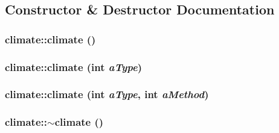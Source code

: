 \subsection{Constructor \& Destructor Documentation}
\hypertarget{classclimate_a36f8f651987de205d69337c77b0b5b4c}{
\subsubsection[{climate}]{\setlength{\rightskip}{0pt plus 5cm}climate::climate ()}}
\label{classclimate_a36f8f651987de205d69337c77b0b5b4c}
\hypertarget{classclimate_a1aa74cca9a2e637a100ed24830f312b1}{
\subsubsection[{climate}]{\setlength{\rightskip}{0pt plus 5cm}climate::climate (int {\em aType})}}
\label{classclimate_a1aa74cca9a2e637a100ed24830f312b1}
\hypertarget{classclimate_ae0c8369f72a3801988c9cc3798db4503}{
\subsubsection[{climate}]{\setlength{\rightskip}{0pt plus 5cm}climate::climate (int {\em aType}, \/  int {\em aMethod})}}
\label{classclimate_ae0c8369f72a3801988c9cc3798db4503}
\hypertarget{classclimate_ab145ad6b1f8d82e8ab385386e25eb9c2}{
\subsubsection[{$\sim$climate}]{\setlength{\rightskip}{0pt plus 5cm}climate::$\sim$climate ()}}
\label{classclimate_ab145ad6b1f8d82e8ab385386e25eb9c2}


